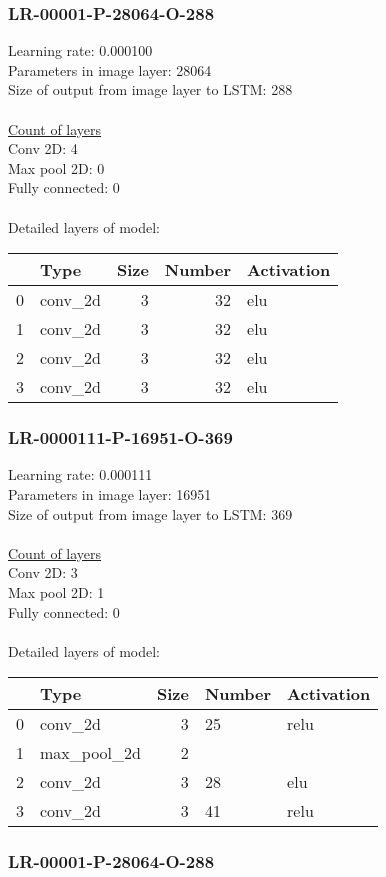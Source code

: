 \subsubsection*{LR-00001-P-28064-O-288}
Learning rate: 0.000100
\\Parameters in image layer: 28064
\\Size of output from image layer to LSTM: 288
\\\\\underline{Count of layers} 
\\Conv 2D:           4\\Max pool 2D:      0\\Fully connected:  0
\\\\Detailed layers of model: \\\begin{tabular}{rlrrl}
\hline
    & Type    &   Size &   Number & Activation   \\
\hline
  0 & conv\_2d &      3 &       32 & elu          \\
  1 & conv\_2d &      3 &       32 & elu          \\
  2 & conv\_2d &      3 &       32 & elu          \\
  3 & conv\_2d &      3 &       32 & elu          \\
\hline
\end{tabular}\subsubsection*{LR-0000111-P-16951-O-369}
Learning rate: 0.000111
\\Parameters in image layer: 16951
\\Size of output from image layer to LSTM: 369
\\\\\underline{Count of layers} 
\\Conv 2D:           3\\Max pool 2D:      1\\Fully connected:  0
\\\\Detailed layers of model: \\\begin{tabular}{rlrll}
\hline
    & Type        &   Size & Number   & Activation   \\
\hline
  0 & conv\_2d     &      3 & 25       & relu         \\
  1 & max\_pool\_2d &      2 &          &              \\
  2 & conv\_2d     &      3 & 28       & elu          \\
  3 & conv\_2d     &      3 & 41       & relu         \\
\hline
\end{tabular}\subsubsection*{LR-00001-P-28064-O-288}
